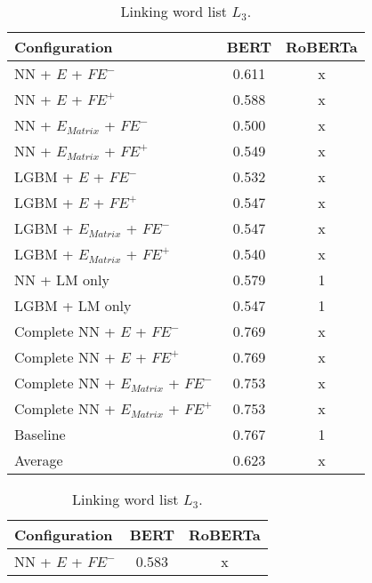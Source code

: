 \begin{table}[h]
  	\tiny
  	\centering
	\begin{subtable}{.5\textwidth}
		\centering
  		\renewcommand{\arraystretch}{1.4}
   		\begin{tabular}{|| l || c | c ||}
   			\hline
   			{Configuration} & {BERT} & {RoBERTa} \\
   			\hline\hline
   			NN + $E$ + $\textit{FE}^-$ &  0.611 & x \\
 			\hline
 			NN + $E$ + $\textit{FE}^+$ & 0.588 & x \\
 			\hline
 			NN + $E_{Matrix}$ + $\textit{FE}^-$ & 0.500 & x \\
 			\hline
 			NN + $E_{Matrix}$ + $\textit{FE}^+$ & 0.549 & x \\
 			\hline
 			LGBM + $E$ + $\textit{FE}^-$ & 0.532 & x \\
 			\hline
 			LGBM + $E$ + $\textit{FE}^+$ & 0.547 & x \\
 			\hline
 			LGBM + $E_{Matrix}$ + $\textit{FE}^-$ & 0.547 & x \\
 			\hline
 			LGBM + $E_{Matrix}$ + $\textit{FE}^+$ & 0.540 & x \\
 			\hline
 			NN + LM only & 0.579 & 1 \\
 			\hline
 			LGBM + LM only & 0.547 & 1 \\
 			\hline
 			Complete NN + $E$ + $\textit{FE}^-$ & 0.769 & x \\
 			\hline
 			Complete NN + $E$ + $\textit{FE}^+$ & 0.769 & x \\
 			\hline
 			Complete NN + $E_{Matrix}$ + $\textit{FE}^-$ & 0.753 & x \\
 			\hline
 			Complete NN + $E_{Matrix}$ + $\textit{FE}^+$ & 0.753 & x \\
 			\hline
 			Baseline & 0.767 & 1\\
 			\hline
 			\hline
 			Average & 0.623 & x \\
 			\hline
		\end{tabular}
		\renewcommand{\arraystretch}{1}
  		\caption{Linking word list $L_3$.}%
  	\end{subtable}%
  	\begin{subtable}{.5\textwidth}
		\centering
  		\renewcommand{\arraystretch}{1.4}
   		\begin{tabular}{|| l || c | c ||}
   			\hline
   			{Configuration} & {BERT} & {RoBERTa} \\
   			\hline\hline
   			NN + $E$ + $\textit{FE}^-$ &  0.583 & x \\

\end{tabular}
\end{subtable}
\end{table}
